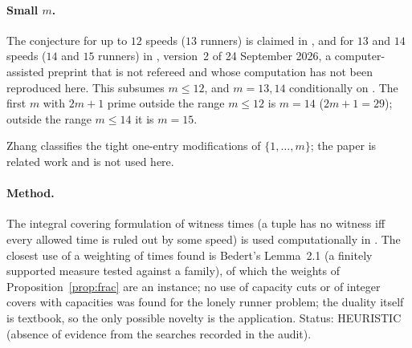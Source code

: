 \documentclass[11pt]{article}
\theoremstyle{remark}
\begin{document}
\paragraph{Small $m$.} The conjecture for up to $12$ speeds ($13$ runners) is claimed in \cite{Ros25,Trak25,Ros25b,ST26}, and for $13$ and $14$ speeds ($14$ and $15$ runners) in \cite{All26}, version~2 of 24 September 2026, a computer-assisted preprint that is not refereed and whose computation has not been reproduced here. This subsumes $m\le12$, and $m=13,14$ conditionally on \cite{All26}. The first $m$ with $2m+1$ prime outside the range $m\le12$ is $m=14$ ($2m+1=29$); outside the range $m\le14$ it is $m=15$.\par Zhang \cite{Zha26} classifies the tight one-entry modifications of $\{1,\dots,m\}$; the paper is related work and is not used here.

\paragraph{Method.} The integral covering formulation of witness times (a tuple has no witness iff every allowed time is ruled out by some speed) is used computationally in \cite{Ros25,Trak25,Ros25b,ST26,All26}. The closest use of a weighting of times found is Bedert's Lemma~2.1 \cite{Bed25} (a finitely supported measure tested against a family), of which the weights of Proposition~\ref{prop:frac} are an instance; no use of capacity cuts or of integer covers with capacities was found for the lonely runner problem; the duality itself is textbook, so the only possible novelty is the application. Status: HEURISTIC (absence of evidence from the searches recorded in the audit).
\end{document}
